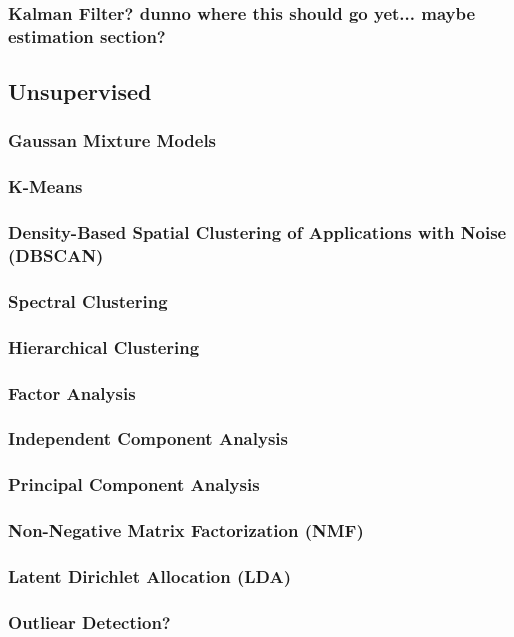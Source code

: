 \documentclass[11pt]{article}
\begin{document}
\subsubsection{Kalman Filter? dunno where this should go yet... maybe estimation section?}
\subsection{Unsupervised}
\subsubsection{Gaussan Mixture Models}
\subsubsection{K-Means}
\subsubsection{Density-Based Spatial Clustering of Applications with Noise (DBSCAN)}
\subsubsection{Spectral Clustering}
\subsubsection{Hierarchical Clustering}
\subsubsection{Factor Analysis}
\subsubsection{Independent Component Analysis}
\subsubsection{Principal Component Analysis}
\subsubsection{Non-Negative Matrix Factorization (NMF)}
\subsubsection{Latent Dirichlet Allocation (LDA)}
\subsubsection{Outliear Detection?}
\end{document}
